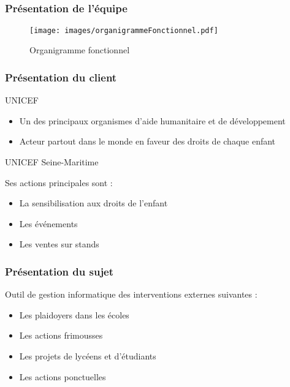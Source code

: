 \subsection{} %

\begin{frame}
\frametitle{Présentation de l'équipe}
	\begin{figure}
		\texttt{[image: images/organigrammeFonctionnel.pdf]}
		\caption{Organigramme fonctionnel}
		\label{OF}
	\end{figure}
\end{frame}

\begin{frame}
\frametitle{Présentation du client}
	\begin{center}
		UNICEF
	\end{center}
	\begin{itemize}
		\item Un des principaux organismes d’aide humanitaire et de développement
		\item Acteur partout dans le monde en faveur des droits de chaque enfant
	\end{itemize}
	
	\begin{center}
		UNICEF Seine-Maritime
	\end{center}
	Ses actions principales sont : 
	\begin{itemize}
		\item La sensibilisation aux droits de l'enfant
		\item Les événements 
		\item Les ventes sur stands
	\end{itemize}
	
\end{frame}
\begin{frame}
\frametitle{Présentation du sujet}
Outil de gestion informatique des interventions externes suivantes :

	\begin{itemize}
		\item Les plaidoyers dans les \'ecoles
		\item Les actions frimousses
		\item Les projets de lycéens et d'étudiants
		\item Les actions ponctuelles
	\end{itemize}
	
\end{frame}